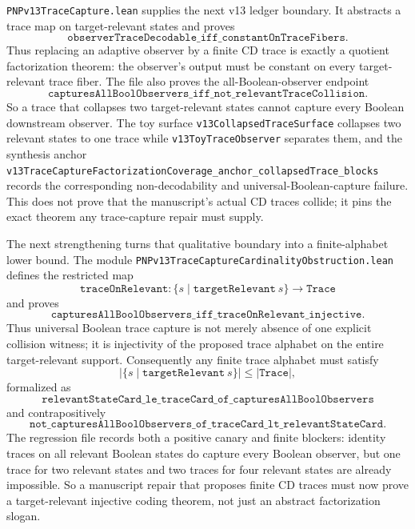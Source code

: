 \documentclass[11pt]{article}
\theoremstyle{remark}
\begin{document}
\texttt{PNPv13TraceCapture.lean} supplies the next v13 ledger boundary.  It
abstracts a trace map on target-relevant states and proves
\[
  \texttt{observerTraceDecodable\_iff\_constantOnTraceFibers}.
\]
Thus replacing an adaptive observer by a finite CD trace is exactly a quotient
factorization theorem: the observer's output must be constant on every
target-relevant trace fiber.  The file also proves the all-Boolean-observer
endpoint
\[
  \texttt{capturesAllBoolObservers\_iff\_not\_relevantTraceCollision}.
\]
So a trace that collapses two target-relevant states cannot capture every
Boolean downstream observer.  The toy surface
\texttt{v13CollapsedTraceSurface} collapses two relevant states to one trace
while \texttt{v13ToyTraceObserver} separates them, and the synthesis anchor
\texttt{v13TraceCaptureFactorizationCoverage\_anchor\_collapsedTrace\_blocks}
records the corresponding non-decodability and universal-Boolean-capture
failure.  This does not prove that the manuscript's actual CD traces collide;
it pins the exact theorem any trace-capture repair must supply.

The next strengthening turns that qualitative boundary into a finite-alphabet
lower bound.  The module
\texttt{PNPv13TraceCaptureCardinalityObstruction.lean} defines the restricted
map
\[
  \texttt{traceOnRelevant} : \{s \mid \texttt{targetRelevant}\ s\} \to \texttt{Trace}
\]
and proves
\[
  \texttt{capturesAllBoolObservers\_iff\_traceOnRelevant\_injective}.
\]
Thus universal Boolean trace capture is not merely absence of one explicit
collision witness; it is injectivity of the proposed trace alphabet on the
entire target-relevant support.  Consequently any finite trace alphabet must
satisfy
\[
  |\{s \mid \texttt{targetRelevant}\ s\}| \le |\texttt{Trace}|,
\]
formalized as
\[
  \texttt{relevantStateCard\_le\_traceCard\_of\_capturesAllBoolObservers}
\]
and contrapositively
\[
  \texttt{not\_capturesAllBoolObservers\_of\_traceCard\_lt\_relevantStateCard}.
\]
The regression file records both a positive canary and finite blockers:
identity traces on all relevant Boolean states do capture every Boolean
observer, but one trace for two relevant states and two traces for four
relevant states are already impossible.  So a manuscript repair that proposes
finite CD traces must now prove a target-relevant injective coding theorem, not
just an abstract factorization slogan.
\end{document}
